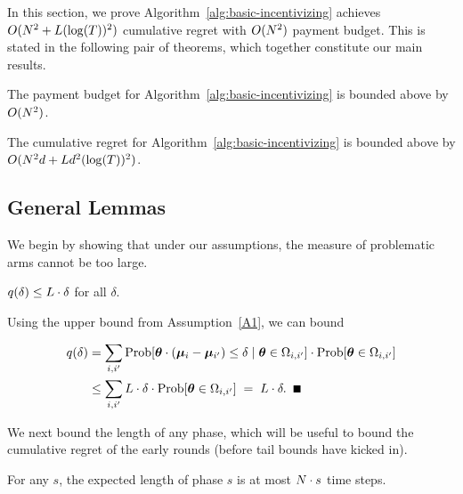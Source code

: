 In this section, we prove Algorithm~\ref{alg:basic-incentivizing} achieves $O(N^2+L(\log(T))^2)$ cumulative regret with $O(N^2)$ payment budget.  This is stated in the following pair of theorems, which together constitute our main results.

\begin{theorem}
The payment budget for Algorithm~\ref{alg:basic-incentivizing} is bounded above by $O(N^2)$. 
\label{rst:budget}
\end{theorem}


\begin{theorem}
The cumulative regret for Algorithm~\ref{alg:basic-incentivizing}
is bounded above by $O(N^2 d + L d^2(\log(T))^2)$.
\label{rst:regret}
\end{theorem}

\subsection{General Lemmas}

We begin by showing that under our assumptions, the measure of
problematic arms cannot be too large.

\begin{lemma} \label{lem:sdelta}
$q(\delta) \leq L \cdot \delta$ for all $\delta$.
\end{lemma}

\begin{emptyproof}
Using the upper bound from Assumption~\ref{A1}, we can bound

\begin{align*}
\AlmostTied{\delta}
& = \sum_{i,i'} \ProbC{\AgV \cdot (\ArmV{i} - \ArmV{i'}) \leq \delta}%
    {\AgV \in \FirstTwo{i}{i'}}
  \cdot \Prob{\AgV \in \FirstTwo{i}{i'}}\\
& \leq \sum_{i,i'} \TieDensity \cdot \delta
    \cdot \Prob{\AgV \in \FirstTwo{i}{i'}}
\; = \; \TieDensity \cdot \delta. \QED
\end{align*}
\end{emptyproof}

We next bound the length of any phase, which will be useful to bound
the cumulative regret of the early rounds
(before tail bounds have kicked in).

\begin{lemma} \label{lem:phase-length}
For any $s$, the expected length of phase $s$ is at most
$N \cdot s$ time steps.
\end{lemma}

